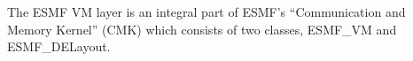 
The ESMF VM layer is an integral part of ESMF's ``Communication and Memory Kernel'' (CMK) which consists of two classes, ESMF\_VM and ESMF\_DELayout.


